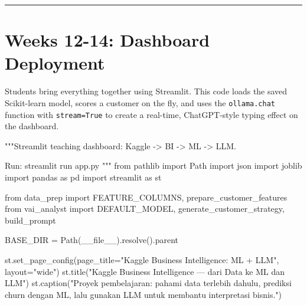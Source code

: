 \documentclass[
  indonesian,
  letterpaper,
  DIV=11,
  numbers=noendperiod]{scrreprt}
\newenvironment{Shaded}{\begin{snugshade}}{\end{snugshade}}
\newcommand{\CommentTok}[1]{\textcolor[rgb]{0.37,0.37,0.37}{#1}}
\newcommand{\ImportTok}[1]{\textcolor[rgb]{0.00,0.46,0.62}{#1}}
\newcommand{\NormalTok}[1]{\textcolor[rgb]{0.00,0.23,0.31}{#1}}
\newcommand{\OperatorTok}[1]{\textcolor[rgb]{0.37,0.37,0.37}{#1}}
\newcommand{\StringTok}[1]{\textcolor[rgb]{0.13,0.47,0.30}{#1}}
\newcommand{\VariableTok}[1]{\textcolor[rgb]{0.07,0.07,0.07}{#1}}
\begin{document}
\begin{center}\rule{0.5\linewidth}{0.5pt}\end{center}

\section{Weeks 12-14: Dashboard
Deployment}\label{weeks-12-14-dashboard-deployment}

Students bring everything together using Streamlit. This code loads the
saved Scikit-learn model, scores a customer on the fly, and uses the
\texttt{ollama.chat} function with \texttt{stream=True} to create a
real-time, ChatGPT-style typing effect on the dashboard.

\begin{Shaded}
\begin{Highlighting}[]
\CommentTok{"""Streamlit teaching dashboard: Kaggle {-}\textgreater{} BI {-}\textgreater{} ML {-}\textgreater{} LLM.}

\CommentTok{Run:}
\CommentTok{    streamlit run app.py}
\CommentTok{"""}
\ImportTok{from}\NormalTok{ pathlib }\ImportTok{import}\NormalTok{ Path}
\ImportTok{import}\NormalTok{ json}
\ImportTok{import}\NormalTok{ joblib}
\ImportTok{import}\NormalTok{ pandas }\ImportTok{as}\NormalTok{ pd}
\ImportTok{import}\NormalTok{ streamlit }\ImportTok{as}\NormalTok{ st}

\ImportTok{from}\NormalTok{ data\_prep }\ImportTok{import}\NormalTok{ FEATURE\_COLUMNS, prepare\_customer\_features}
\ImportTok{from}\NormalTok{ vai\_analyst }\ImportTok{import}\NormalTok{ DEFAULT\_MODEL, generate\_customer\_strategy, build\_prompt}

\NormalTok{BASE\_DIR }\OperatorTok{=}\NormalTok{ Path(}\VariableTok{\_\_file\_\_}\NormalTok{).resolve().parent}

\NormalTok{st.set\_page\_config(page\_title}\OperatorTok{=}\StringTok{"Kaggle Business Intelligence: ML + LLM"}\NormalTok{, layout}\OperatorTok{=}\StringTok{"wide"}\NormalTok{)}
\NormalTok{st.title(}\StringTok{"Kaggle Business Intelligence — dari Data ke ML dan LLM"}\NormalTok{)}
\NormalTok{st.caption(}\StringTok{"Proyek pembelajaran: pahami data terlebih dahulu, prediksi churn dengan ML, lalu gunakan LLM untuk membantu interpretasi bisnis."}\NormalTok{)}



\end{Highlighting}
\end{Shaded}
\end{document}
